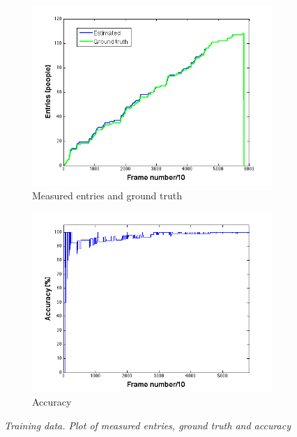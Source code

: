 \begin{figure}[H]
\centering
\begin{subfigure}{.5\textwidth}
  \centering
  \includegraphics[width=1.1\linewidth]{images/EntriesTest.png}
  \caption{Measured entries and ground truth}
  \label{fig:sub1}
\end{subfigure}%
\begin{subfigure}{.5\textwidth}
  \centering
  \includegraphics[width=1.1\linewidth]{images/AccEntriesTest.png}
  \caption{Accuracy}
  \label{fig:sub2}
\end{subfigure}
\caption[Entries training]{\textit{Training data. Plot of measured entries, ground truth and accuracy}}
\label{fig:Entries Training data}
\end{figure}

